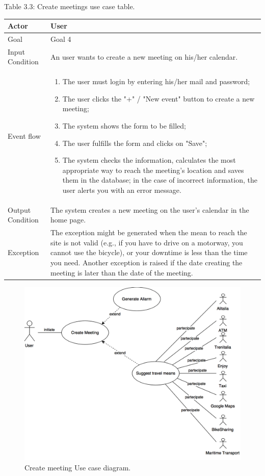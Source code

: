 \documentclass{article}
\begin{document}
	\begin{center}
		Table 3.3: Create meetings use case table.
		
		\bigskip
    		\begin{tabular}{p{}|p{}}
   		 	\hline
    			Actor & User \\ \hline
    			Goal & Goal 4 \\ \hline
    			Input Condition & An user wants to create a new meeting on his/her calendar.\\ \hline
    			Event flow & 
			\begin{enumerate}
  				\item The user must login by entering his/her mail and password;
  				\item The user clicks the "+" / "New event" button to create a new meeting;
  				\item The system shows the form to be filled;
  				\item The user fulfills the form and clicks on "Save";
  				\item The system checks the information, calculates the most appropriate way to reach the meeting's location and saves them in the database; in the case of incorrect information, the user alerts you with an error message.
 			 \end{enumerate} \\ \hline
    			Output Condition & The system creates a new meeting on the user's calendar in the home page. \\ \hline
    			Exception & The exception might be generated when the mean to reach the site is not valid (e.g., if you have to drive on a motorway, you cannot use the bicycle), or your downtime is less than the time you need. Another exception is raised if the date creating the meeting is later than the date of the meeting. \\ \hline
    		\end{tabular}
	\end{center}
	
	\bigskip
	\begin{figure}[h!]
		\bigskip
		\centering
		\includegraphics[scale=0.25]{img/diagrams/create_meeting_uc.png}
		\caption{Create meeting Use case diagram.}
	\end{figure}
	
\end{document}
